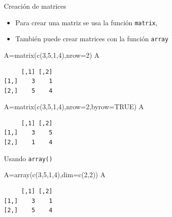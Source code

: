\documentclass[
  ignorenonframetext,
  aspectratio=169,
  spanish,
]{beamer}
\newenvironment{Shaded}{\begin{snugshade}}{\end{snugshade}}
\newcommand{\AttributeTok}[1]{\textcolor[rgb]{0.40,0.45,0.13}{#1}}
\newcommand{\ConstantTok}[1]{\textcolor[rgb]{0.56,0.35,0.01}{#1}}
\newcommand{\DecValTok}[1]{\textcolor[rgb]{0.68,0.00,0.00}{#1}}
\newcommand{\FunctionTok}[1]{\textcolor[rgb]{0.28,0.35,0.67}{#1}}
\newcommand{\NormalTok}[1]{\textcolor[rgb]{0.00,0.23,0.31}{#1}}
\newcommand{\OtherTok}[1]{\textcolor[rgb]{0.00,0.23,0.31}{#1}}
\begin{document}
\begin{frame}[fragile]{Creación de matrices}
\label{creaciuxf3n-de-matrices}
\begin{itemize}
\item
  Para crear una matriz se usa la función \texttt{matrix},
\item
  También puede crear matrices con la función \texttt{array}
\end{itemize}

\begin{Shaded}
\begin{Highlighting}[]
\NormalTok{A}\OtherTok{=}\FunctionTok{matrix}\NormalTok{(}\FunctionTok{c}\NormalTok{(}\DecValTok{3}\NormalTok{,}\DecValTok{5}\NormalTok{,}\DecValTok{1}\NormalTok{,}\DecValTok{4}\NormalTok{),}\AttributeTok{nrow=}\DecValTok{2}\NormalTok{) }
\NormalTok{A}
\end{Highlighting}
\end{Shaded}

\begin{verbatim}
     [,1] [,2]
[1,]    3    1
[2,]    5    4
\end{verbatim}

\begin{Shaded}
\begin{Highlighting}[]
\NormalTok{A}\OtherTok{=}\FunctionTok{matrix}\NormalTok{(}\FunctionTok{c}\NormalTok{(}\DecValTok{3}\NormalTok{,}\DecValTok{5}\NormalTok{,}\DecValTok{1}\NormalTok{,}\DecValTok{4}\NormalTok{),}\AttributeTok{nrow=}\DecValTok{2}\NormalTok{,}\AttributeTok{byrow=}\ConstantTok{TRUE}\NormalTok{) }
\NormalTok{A}
\end{Highlighting}
\end{Shaded}

\begin{verbatim}
     [,1] [,2]
[1,]    3    5
[2,]    1    4
\end{verbatim}
\end{frame}

\begin{frame}[fragile]{Usando \texttt{array()}}
\label{usando-array}
\begin{Shaded}
\begin{Highlighting}[]
\NormalTok{A}\OtherTok{=}\FunctionTok{array}\NormalTok{(}\FunctionTok{c}\NormalTok{(}\DecValTok{3}\NormalTok{,}\DecValTok{5}\NormalTok{,}\DecValTok{1}\NormalTok{,}\DecValTok{4}\NormalTok{),}\AttributeTok{dim=}\FunctionTok{c}\NormalTok{(}\DecValTok{2}\NormalTok{,}\DecValTok{2}\NormalTok{)) }
\NormalTok{A}
\end{Highlighting}
\end{Shaded}

\begin{verbatim}
     [,1] [,2]
[1,]    3    1
[2,]    5    4
\end{verbatim}
\end{frame}
\end{document}
